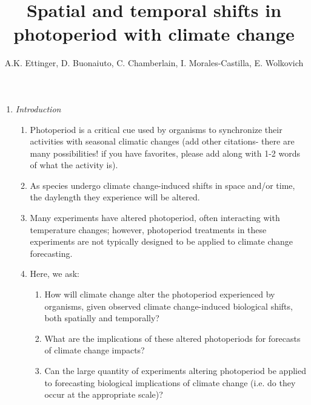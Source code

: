 \documentclass{article}
\begin{document}
 
\title{Spatial and temporal shifts in photoperiod with climate change} %

\author{A.K. Ettinger, D. Buonaiuto, C. Chamberlain, I. Morales-Castilla, E. Wolkovich}
\maketitle  %
\begin{enumerate}
\item \textit{Introduction}
\begin{enumerate}
\item Photoperiod is a critical cue used by organisms to synchronize their activities with seasonal climatic changes (add other citations- there are many possibilities! if you have favorites, please add along with 1-2 words of what the activity is)\citep[e.g.,][]{hsu2011,singh2017}.
\item As species undergo climate change-induced shifts in space and/or time, the daylength they experience will be altered. 
\item Many experiments have altered photoperiod, often interacting with temperature changes; however, photoperiod treatments in these experiments are not typically designed to be applied to climate change forecasting. 
\item Here, we ask: 
\begin{enumerate}
\item How will climate change alter the photoperiod experienced by organisms, given observed climate change-induced biological shifts, both spatially and temporally?
\item What are the implications of these altered photoperiods for forecasts of climate change impacts?
\item Can the large quantity of experiments altering photoperiod be applied to forecasting biological implications of climate change (i.e. do they occur at the appropriate scale)?
\end{enumerate}
\end{enumerate}


\end{enumerate}
\end{document}
